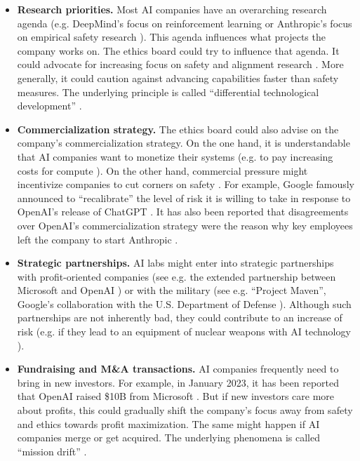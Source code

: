 \documentclass{article}
\begin{document}
\begin{itemize}[leftmargin=2em]
    \item \textbf{Research priorities.} Most AI companies have an overarching research agenda (e.g. DeepMind’s focus on reinforcement learning \cite{silver2021reward} or Anthropic’s focus on empirical safety research \cite{anthropic2023coreviews}). This agenda influences what projects the company works on. The ethics board could try to influence that agenda. It could advocate for increasing focus on safety and alignment research \cite{amodei2016concrete, hendrycks2022unsolved, ngo2023alignment}. More generally, it could caution against advancing capabilities faster than safety measures. The underlying principle is called “differential technological development” \cite{bostrom2001analyzing, ord2020precipice, sandbrink2022differential}.
    \item \textbf{Commercialization strategy.} The ethics board could also advise on the company’s commercialization strategy. On the one hand, it is understandable that AI companies want to monetize their systems (e.g. to pay increasing costs for compute \cite{sevilla2022compute}). On the other hand, commercial pressure might incentivize companies to cut corners on safety \cite{armstrong2016racing, naude2020race}. For example, Google famously announced to “recalibrate” the level of risk it is willing to take in response to OpenAI’s release of ChatGPT \cite{grant2023googlehelp}. It has also been reported that disagreements over OpenAI’s commercialization strategy were the reason why key employees left the company to start Anthropic \cite{waters2021rebelai}.
    \item \textbf{Strategic partnerships.} AI labs might enter into strategic partnerships with profit-oriented companies (see e.g. the extended partnership between Microsoft and OpenAI \cite{microsoft2023openai}) or with the military (see e.g. “Project Maven”, Google’s collaboration with the U.S. Department of Defense \cite{conger2018pentagonai}). Although such partnerships are not inherently bad, they could contribute to an increase of risk (e.g. if they lead to an equipment of nuclear weapons with AI technology \cite{maas2019viable}).
    \item \textbf{Fundraising and M\&A transactions.} AI companies frequently need to bring in new investors. For example, in January 2023, it has been reported that OpenAI raised \$10B from Microsoft \cite{hoffman2023microsoftchatgpt, openai2023microsoft}. But if new investors care more about profits, this could gradually shift the company’s focus away from safety and ethics towards profit maximization. The same might happen if AI companies merge or get acquired. The underlying phenomena is called “mission drift” \cite{grimes2019anchors}.
\end{itemize}
\end{document}
